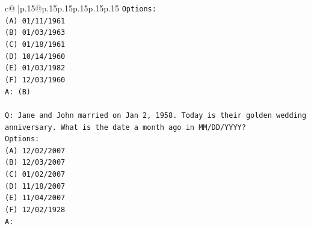 \documentclass{article}
\begin{document}
{\begin{supertabular}{c@{$\;$}|p{.15\linewidth}@{}p{.15\linewidth}p{.15\linewidth}p{.15\linewidth}p{.15\linewidth}p{.15\linewidth}}
{{{\texttt{Options:} \\
\texttt{(A) 01/11/1961} \\
\texttt{(B) 01/03/1963} \\
\texttt{(C) 01/18/1961} \\
\texttt{(D) 10/14/1960} \\
\texttt{(E) 01/03/1982} \\
\texttt{(F) 12/03/1960} \\
\texttt{A: (B)} \\
\\ 
\texttt{Q: Jane and John married on Jan 2, 1958. Today is their golden wedding anniversary. What is the date a month ago in MM/DD/YYYY?} \\
\texttt{Options:} \\
\texttt{(A) 12/02/2007} \\
\texttt{(B) 12/03/2007} \\
\texttt{(C) 01/02/2007} \\
\texttt{(D) 11/18/2007} \\
\texttt{(E) 11/04/2007} \\
\texttt{(F) 12/02/1928} \\
\texttt{A:} \\
            }
        }
    }
     \\ \\


\end{supertabular}}
\end{document}
